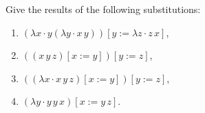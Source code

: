 \begin{problem}
    Give the results of the following substitutions:
    \begin{enumerate}[label=$(\alph*)$]
        \item $(\lambda x \cdot y (\lambda y \cdot x \, y)) [y := \lambda z \cdot z \, x]$, 
        \item $((x \, y \, z) [x := y]) [y := z]$, 
        \item $((\lambda x \cdot x \, y \, z) [x := y]) [y := z]$, 
        \item $(\lambda y \cdot y \, y \, x) [x := y \, z]$.
    \end{enumerate}
\end{problem}

\begin{solution}
    
\end{solution}